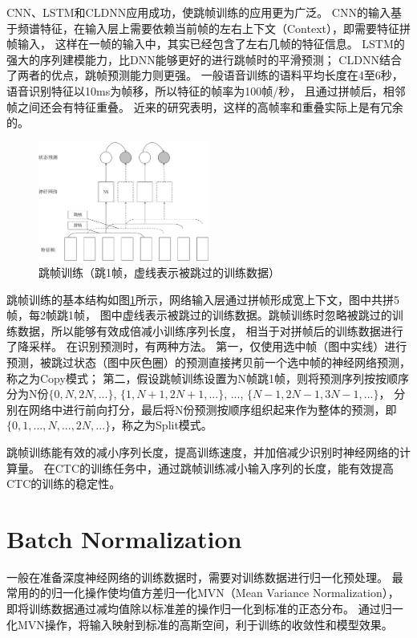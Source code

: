 CNN、LSTM和CLDNN应用成功，使跳帧训练的应用更为广泛。
CNN的输入基于频谱特征，在输入层上需要依赖当前帧的左右上下文（Context），即需要特征拼帧输入，
这样在一帧的输入中，其实已经包含了左右几帧的特征信息。
LSTM的强大的序列建模能力，比DNN能够更好的进行跳帧时的平滑预测；
CLDNN结合了两者的优点，跳帧预测能力则更强。
一般语音训练的语料平均长度在4至6秒，语音识别特征以10ms为帧移，所以特征的帧率为100帧/秒，
且通过拼帧后，相邻帧之间还会有特征重叠。
近来的研究表明，这样的高帧率和重叠实际上是有冗余的。

\begin{figure}[htbp]
\centering
\includegraphics[width=0.5\textwidth]{figures/chapter3/skip-crop}
\caption{跳帧训练（跳1帧，虚线表示被跳过的训练数据）}
\label{fig:skip}
\end{figure}


跳帧训练的基本结构如图\ref{fig:skip}所示，网络输入层通过拼帧形成宽上下文，图中共拼5帧，每2帧跳1帧，
图中虚线表示被跳过的训练数据。跳帧训练时忽略被跳过的训练数据，所以能够有效成倍减小训练序列长度，
相当于对拼帧后的训练数据进行了降采样。
在识别预测时，有两种方法。
第一，仅使用选中帧（图中实线）进行预测，被跳过状态（图中灰色圈）的预测直接拷贝前一个选中帧的神经网络预测，称之为Copy模式；
第二，假设跳帧训练设置为N帧跳1帧，则将预测序列按按顺序分为N份$\{0, N, 2N, ...\}$, $\{1, N+1, 2N+1, ...\}$, ..., $\{N-1, 2N-1, 3N-1, ...\}$，
分别在网络中进行前向打分，最后将N份预测按顺序组织起来作为整体的预测，即$\{0, 1, ..., N, ..., 2N, ...\}$，称之为Split模式。


跳帧训练能有效的减小序列长度，提高训练速度，并加倍减少识别时神经网络的计算量。
在CTC的训练任务中，通过跳帧训练减小输入序列的长度，能有效提高CTC的训练的稳定性。

\section{Batch Normalization}

一般在准备深度神经网络的训练数据时，需要对训练数据进行归一化预处理。
最常用的的归一化操作使均值方差归一化MVN（Mean Variance Normalization），
即将训练数据通过减均值除以标准差的操作归一化到标准的正态分布。
通过归一化MVN操作，将输入映射到标准的高斯空间，利于训练的收敛性和模型效果。

